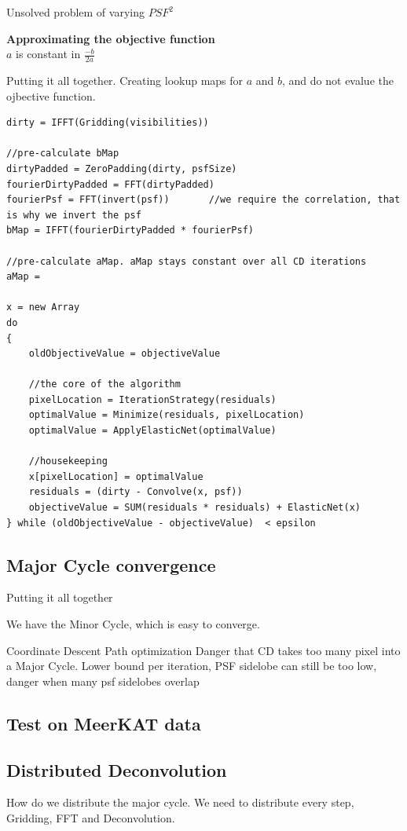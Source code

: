 Unsolved problem of varying $PSF^2$

\textbf{Approximating the objective function}\\
$a$ is constant in $\frac{-b}{2a}$



Putting it all together. Creating lookup maps for $a$ and $b$, and do not evalue the ojbective function.
\begin{lstlisting}
dirty = IFFT(Gridding(visibilities))

//pre-calculate bMap
dirtyPadded = ZeroPadding(dirty, psfSize)
fourierDirtyPadded = FFT(dirtyPadded)
fourierPsf = FFT(invert(psf))		//we require the correlation, that is why we invert the psf
bMap = IFFT(fourierDirtyPadded * fourierPsf)

//pre-calculate aMap. aMap stays constant over all CD iterations
aMap = 
 
x = new Array   
do 
{
	oldObjectiveValue = objectiveValue
	
	//the core of the algorithm
	pixelLocation = IterationStrategy(residuals)
	optimalValue = Minimize(residuals, pixelLocation)
	optimalValue = ApplyElasticNet(optimalValue)
	
	//housekeeping
	x[pixelLocation] = optimalValue
	residuals = (dirty - Convolve(x, psf))
	objectiveValue = SUM(residuals * residuals) + ElasticNet(x)
} while (oldObjectiveValue - objectiveValue)  < epsilon
\end{lstlisting}





\subsection{Major Cycle convergence}
Putting it all together

We have the Minor Cycle, which is easy to converge.

Coordinate Descent Path optimization \cite{friedman2010regularization}
Danger that CD takes too many pixel into a Major Cycle. Lower bound per iteration, PSF sidelobe
  can still be too low, danger when many psf sidelobes overlap

\subsection{Test on MeerKAT data}

\subsection{Distributed Deconvolution}
How do we distribute the major cycle. We need to distribute every step, Gridding, FFT and Deconvolution.

